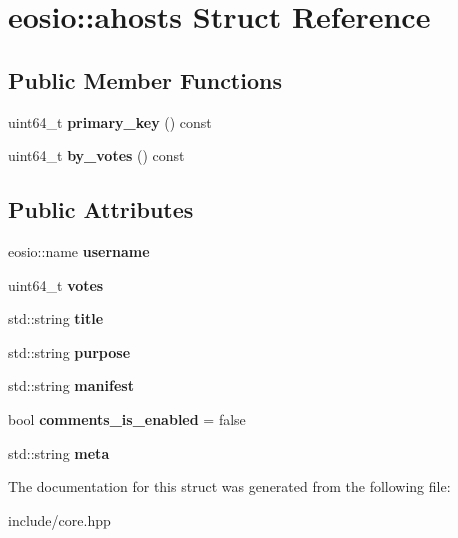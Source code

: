 \hypertarget{structeosio_1_1ahosts}{}\section{eosio\+:\+:ahosts Struct Reference}
\label{structeosio_1_1ahosts}
\subsection*{Public Member Functions}
\begin{DoxyCompactItemize}
\item 
\mbox{\label{structeosio_1_1ahosts_abe62d2c2939883e4f73675cff0515274}} 
uint64\+\_\+t {\bfseries primary\+\_\+key} () const
\item 
\mbox{\label{structeosio_1_1ahosts_a81c4447af51c9ab03bb20c8d7982ad0a}} 
uint64\+\_\+t {\bfseries by\+\_\+votes} () const
\end{DoxyCompactItemize}
\subsection*{Public Attributes}
\begin{DoxyCompactItemize}
\item 
\mbox{\label{structeosio_1_1ahosts_a4fd7620efe849d8f431459a43438fa37}} 
eosio\+::name {\bfseries username}
\item 
\mbox{\label{structeosio_1_1ahosts_ad27fcc2c70016ca95ddec9d59ebfbba4}} 
uint64\+\_\+t {\bfseries votes}
\item 
\mbox{\label{structeosio_1_1ahosts_a8b3e0ada7df6c5e074ed63cb3e611f0c}} 
std\+::string {\bfseries title}
\item 
\mbox{\label{structeosio_1_1ahosts_a9e1a97c0e5544e63f55d69514c121196}} 
std\+::string {\bfseries purpose}
\item 
\mbox{\label{structeosio_1_1ahosts_a4270ae512c4474da1bc5fb17cf970066}} 
std\+::string {\bfseries manifest}
\item 
\mbox{\label{structeosio_1_1ahosts_a86a9e7a306c21d70a068c3c2c90b7d0c}} 
bool {\bfseries comments\+\_\+is\+\_\+enabled} = false
\item 
\mbox{\label{structeosio_1_1ahosts_a65b9c519e80c419271331ce41c9aa0dd}} 
std\+::string {\bfseries meta}
\end{DoxyCompactItemize}


The documentation for this struct was generated from the following file\+:\begin{DoxyCompactItemize}
\item 
include/core.\+hpp\end{DoxyCompactItemize}
